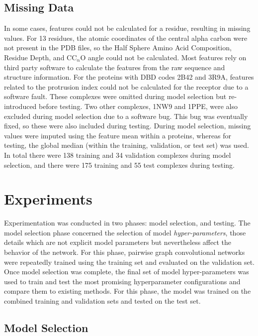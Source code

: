 \subsection{Missing Data}
In some cases, features could not be calculated for a residue, resulting in missing values.
For 13 residues, the atomic coordinates of the central alpha carbon were not present in the PDB files, so the Half Sphere Amino Acid Composition, Residue Depth, and $\mathrm{C C_{\alpha} O}$ angle could not be calculated.
Most features rely on third party software to calculate the features from the raw sequence and structure information.
For the proteins with DBD codes 2B42 and 3R9A, features related to the protrusion index could not be calculated for the receptor due to a software fault.
These complexes were omitted during model selection but re-introduced before testing.
Two other complexes, 1NW9 and 1PPE, were also excluded during model selection due to a software bug.
This bug was eventually fixed, so these were also included during testing. 
During model selection, missing values were imputed using the feature mean within a proteins, whereas for testing, the global median (within the training, validation, or test set) was used.
In total there were 138 training and 34 validation complexes during model selection, and there were 175 training and 55 test complexes during testing.


\section{Experiments}

Experimentation was conducted in two phases: model selection, and testing.
The model selection phase concerned the selection of model \emph{hyper-parameters}, those details which are not explicit model parameters but nevertheless affect the behavior of the network.
For this phase, pairwise graph convolutional networks were repeatedly trained using the training set and evaluated on the validation set.
Once model selection was complete, the final set of model hyper-parameters was used to train and test the most promising hyperparameter configurations and compare them to existing methods.
For this phase, the model was trained on the combined training and validation sets and tested on the test set.


\subsection{Model Selection}


